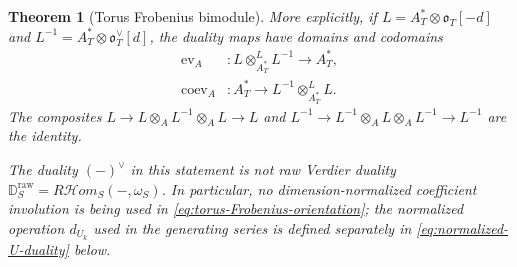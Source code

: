\documentclass[11pt]{article}
\newtheorem{theorem}{Theorem}[section]
\theoremstyle{definition}
\theoremstyle{remark}
\newcommand{\Uk}{U_k}
\newcommand{\D}{\mathbb D}
\begin{document}
\begin{theorem}[Torus Frobenius bimodule]
More explicitly, if $L=A_T^*\otimes\mathfrak o_T[-d]$ and
$L^{-1}=A_T^*\otimes\mathfrak o_T^\vee[d]$, the duality maps have domains and
codomains
\begin{align*}
 \operatorname{ev}_A&:L\otimes^L_{A_T^*}L^{-1}\longrightarrow A_T^*,\\
 \operatorname{coev}_A&:A_T^*\longrightarrow
 L^{-1}\otimes^L_{A_T^*}L.
\end{align*}
The composites
$L\to L\otimes_A L^{-1}\otimes_A L\to L$ and
$L^{-1}\to L^{-1}\otimes_A L\otimes_A L^{-1}\to L^{-1}$ are the identity.

The duality $(-)^\vee$ in this statement is not raw Verdier duality
$\D_S^{\mathrm{raw}}=R\mathcal Hom_S(-,\omega_S)$.  In particular, no
dimension-normalized coefficient involution is being used in
\eqref{eq:torus-Frobenius-orientation}; the normalized operation $d_{\Uk}$ used in
the generating series is defined separately in
\eqref{eq:normalized-U-duality} below.
\end{theorem}
\end{document}

